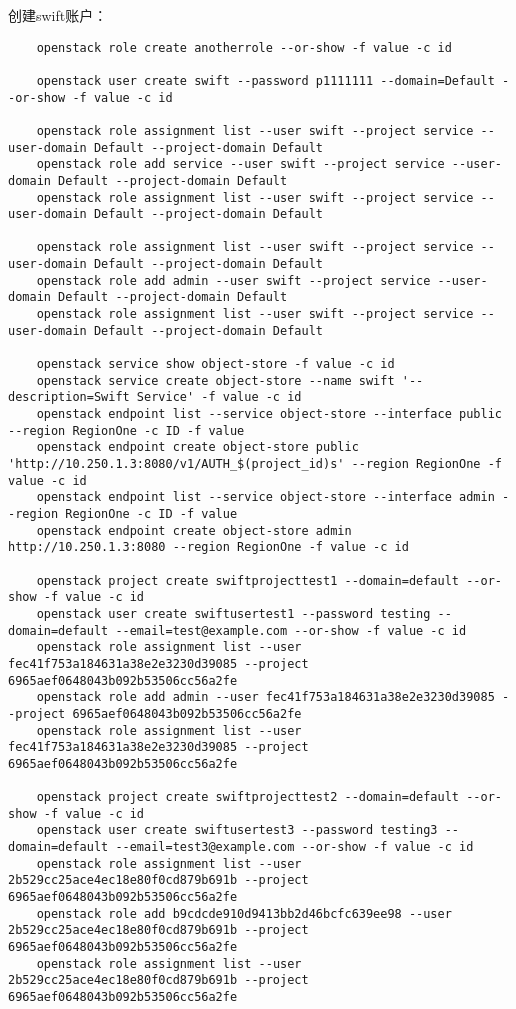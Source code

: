 \documentclass[a4paper,left=1.5cm,right=1.5cm,11pt]{article}
\begin{document}
	创建swift账户：
	\begin{lstlisting}
	openstack role create anotherrole --or-show -f value -c id
	
	openstack user create swift --password p1111111 --domain=Default --or-show -f value -c id
	
	openstack role assignment list --user swift --project service --user-domain Default --project-domain Default
	openstack role add service --user swift --project service --user-domain Default --project-domain Default
	openstack role assignment list --user swift --project service --user-domain Default --project-domain Default

	openstack role assignment list --user swift --project service --user-domain Default --project-domain Default
	openstack role add admin --user swift --project service --user-domain Default --project-domain Default
	openstack role assignment list --user swift --project service --user-domain Default --project-domain Default

	openstack service show object-store -f value -c id
	openstack service create object-store --name swift '--description=Swift Service' -f value -c id
	openstack endpoint list --service object-store --interface public --region RegionOne -c ID -f value
	openstack endpoint create object-store public 'http://10.250.1.3:8080/v1/AUTH_$(project_id)s' --region RegionOne -f value -c id
	openstack endpoint list --service object-store --interface admin --region RegionOne -c ID -f value
	openstack endpoint create object-store admin http://10.250.1.3:8080 --region RegionOne -f value -c id

	openstack project create swiftprojecttest1 --domain=default --or-show -f value -c id
	openstack user create swiftusertest1 --password testing --domain=default --email=test@example.com --or-show -f value -c id
	openstack role assignment list --user fec41f753a184631a38e2e3230d39085 --project 6965aef0648043b092b53506cc56a2fe
	openstack role add admin --user fec41f753a184631a38e2e3230d39085 --project 6965aef0648043b092b53506cc56a2fe
	openstack role assignment list --user fec41f753a184631a38e2e3230d39085 --project 6965aef0648043b092b53506cc56a2fe

	openstack project create swiftprojecttest2 --domain=default --or-show -f value -c id
	openstack user create swiftusertest3 --password testing3 --domain=default --email=test3@example.com --or-show -f value -c id
	openstack role assignment list --user 2b529cc25ace4ec18e80f0cd879b691b --project 6965aef0648043b092b53506cc56a2fe
	openstack role add b9cdcde910d9413bb2d46bcfc639ee98 --user 2b529cc25ace4ec18e80f0cd879b691b --project 6965aef0648043b092b53506cc56a2fe
	openstack role assignment list --user 2b529cc25ace4ec18e80f0cd879b691b --project 6965aef0648043b092b53506cc56a2fe


\end{lstlisting}
\end{document}
